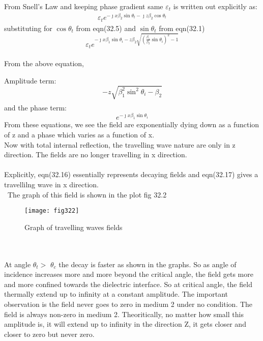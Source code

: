 From Snell's Law and keeping phase gradient same $\varepsilon_t$ is written out explicitly as:
\begin{align}
\varepsilon_te^{- \jmath x\beta_2\sin\theta_t - \jmath z\beta_2\cos\theta_t}
\end{align}
substituting for $\cos\theta_t$ from eqn(32.5)
and $\sin\theta_t$ from eqn(32.1)
\begin{equation}
\varepsilon_te^{- {\jmath x\beta_1\sin\theta_i} - z \beta_2\sqrt{{(\frac{\beta_1}{\beta_2}\sin\theta_i)}^2 - 1}}
\end{equation}\\
From the above equation,

Amplitude term:
\begin{equation}
-z\sqrt{\beta_1^2\sin^2\theta_i - \beta_2}
\end{equation}
\begin{align*}
\end{align*}
and the phase term:
\begin{equation}
e^{- \jmath x\beta_1\sin\theta_i}
\end{equation}
From these equations, we see the field are exponentially dying down as a function of z and a phase which varies as a function of x.\\
Now with total internal reflection, the travelling wave nature are only in z direction. The fields are no longer travelling in x direction.\\ \\
Explicitly, eqn(32.16) essentially represents decaying fields and eqn(32.17) gives a travellilng wave in x direction.\\ \
The graph of this field is shown in the plot fig 32.2
\begin{figure}[h]
	\centering
	\texttt{[image: fig322]}
	\caption{Graph of travelling waves fields}
\end{figure}\\ \\
At angle $\theta_t >$ $\theta_c$ the decay is faster as shown in the graphs. 
So as angle of incidence increases more and more beyond the critical angle, the field gets more and more confined towards the dielectric interface. So at critical angle, the field thermally extend up to infinity at a constant amplitude. The important observation is the field never goes to zero in medium 2 under no condition. The field is always non-zero in medium 2. Theoritically, no matter how small this amplitude is, it will extend up to infinity in the direction Z, it gets closer and closer to zero but never zero.

